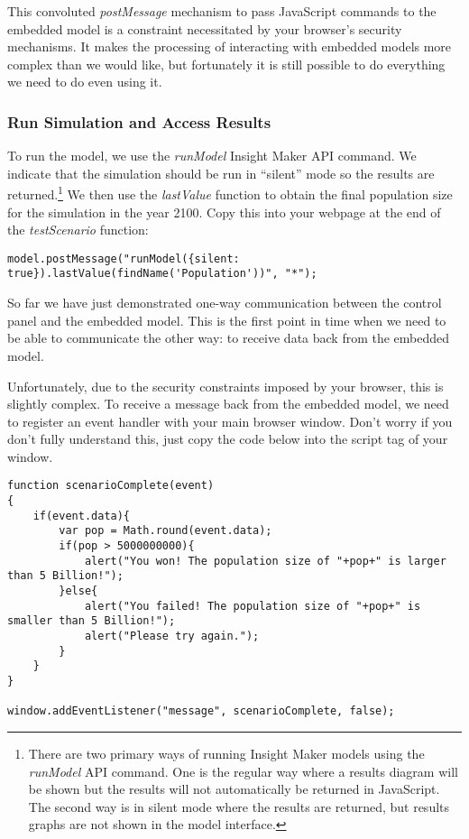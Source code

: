 \documentclass[]{memoir}
\begin{document}
This convoluted \emph{postMessage} mechanism to pass JavaScript commands
to the embedded model is a constraint necessitated by your browser's
security mechanisms. It makes the processing of interacting with
embedded models more complex than we would like, but fortunately it is
still possible to do everything we need to do even using it.

\subsubsection{Run Simulation and Access Results}

To run the model, we use the \emph{runModel} Insight Maker API command.
We indicate that the simulation should be run in ``silent'' mode so the
results are returned.\footnote{There are two primary ways of running
  Insight Maker models using the \emph{runModel} API command. One is the
  regular way where a results diagram will be shown but the results will
  not automatically be returned in JavaScript. The second way is in
  silent mode where the results are returned, but results graphs are not
  shown in the model interface.} We then use the \emph{lastValue}
function to obtain the final population size for the simulation in the
year 2100. Copy this into your webpage at the end of the
\emph{testScenario} function:

\begin{lstlisting}
model.postMessage("runModel({silent: true}).lastValue(findName('Population'))", "*");
\end{lstlisting}

So far we have just demonstrated one-way communication between the
control panel and the embedded model. This is the first point in time
when we need to be able to communicate the other way: to receive data
back from the embedded model.

Unfortunately, due to the security constraints imposed by your browser,
this is slightly complex. To receive a message back from the embedded
model, we need to register an event handler with your main browser
window. Don't worry if you don't fully understand this, just copy the
code below into the script tag of your window.

\begin{lstlisting}
function scenarioComplete(event)
{
    if(event.data){
        var pop = Math.round(event.data);
        if(pop > 5000000000){
            alert("You won! The population size of "+pop+" is larger than 5 Billion!");
        }else{
            alert("You failed! The population size of "+pop+" is smaller than 5 Billion!");
            alert("Please try again.");
        }
    }
}

window.addEventListener("message", scenarioComplete, false);
\end{lstlisting}
\end{document}
